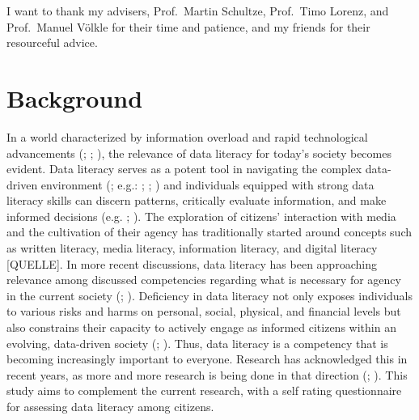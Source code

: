 \documentclass[
  12pt,
  a4paper,
  twoside]{article}
\begin{document}
I want to thank my advisers, Prof.~Martin Schultze, Prof.~Timo Lorenz, and Prof.~Manuel Völkle for their time and patience, and my friends for their resourceful advice.

\newpage\null\thispagestyle{empty}\newpage

\section{Background}\label{background}

In a world characterized by information overload and rapid technological advancements (; ; ), the relevance of data literacy for today's society becomes evident. Data literacy serves as a potent tool in navigating the complex data-driven environment (; e.g.: ; ; ) and individuals equipped with strong data literacy skills can discern patterns, critically evaluate information, and make informed decisions (e.g. ; ).
The exploration of citizens' interaction with media and the cultivation of their agency has traditionally started around concepts such as written literacy, media literacy, information literacy, and digital literacy {[}QUELLE{]}. In more recent discussions, data literacy has been approaching relevance among discussed competencies regarding what is necessary for agency in the current society (; ). Deficiency in data literacy not only exposes individuals to various risks and harms on personal, social, physical, and financial levels but also constrains their capacity to actively engage as informed citizens within an evolving, data-driven society (; ). Thus, data literacy is a competency that is becoming increasingly important to everyone. Research has acknowledged this in recent years, as more and more research is being done in that direction (; ). This study aims to complement the current research, with a self rating questionnaire for assessing data literacy among citizens.
\end{document}
